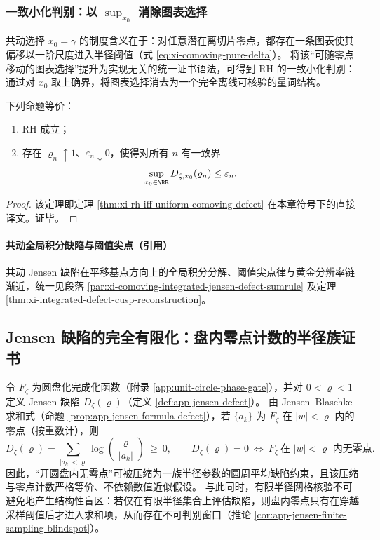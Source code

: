 \subsubsection{一致小化判别：以 \texorpdfstring{$\sup_{x_0}$}{sup\_{x0}} 消除图表选择}
共动选择 \(x_0=\gamma\) 的制度含义在于：对任意潜在离切片零点，都存在一条图表使其偏移以一阶尺度进入半径阈值（式 \eqref{eq:xi-comoving-pure-delta}）。
将该“可随零点移动的图表选择”提升为实现无关的统一证书语法，可得到 RH 的一致小化判别：通过对 \(x_0\) 取上确界，将图表选择消去为一个完全离线可核验的量词结构。
\begin{theorem}\label{thm:cdim-rh-iff-uniform-comoving-defect}
下列命题等价：
\begin{enumerate}
  \item[(i)] RH 成立；
  \item[(ii)] 存在 \(\varrho_n\uparrow 1\)、\(\varepsilon_n\downarrow 0\)，使得对所有 \(n\) 有一致界
  \[
  \sup_{x_0\in\RR}D_{\zeta,x_0}(\varrho_n)\le \varepsilon_n.
  \]
\end{enumerate}
\end{theorem}
\begin{proof}
该定理即定理 \ref{thm:xi-rh-iff-uniform-comoving-defect} 在本章符号下的直接译文。证毕。
\end{proof}

\paragraph{共动全局积分缺陷与阈值尖点（引用）}
共动 Jensen 缺陷在平移基点方向上的全局积分分解、阈值尖点律与黄金分辨率链渐近，统一见段落 \ref{par:xi-comoving-integrated-jensen-defect-sumrule} 及定理 \ref{thm:xi-integrated-defect-cusp-reconstruction}。




\subsection{Jensen 缺陷的完全有限化：盘内零点计数的半径族证书}\label{subsec:cdim-jensen-defect-finiteization}
令 \(F_\zeta\) 为圆盘化完成化函数（附录 \ref{app:unit-circle-phase-gate}），并对 \(0<\varrho<1\) 定义 Jensen 缺陷 \(D_\zeta(\varrho)\)（定义 \ref{def:app-jensen-defect}）。
由 Jensen--Blaschke 求和式（命题 \ref{prop:app-jensen-formula-defect}），若 \(\{a_k\}\) 为 \(F_\zeta\) 在 \(|w|<\varrho\) 内的零点（按重数计），则
\[
D_\zeta(\varrho)=\sum_{|a_k|<\varrho}\log\!\left(\frac{\varrho}{|a_k|}\right)\ \ge\ 0,
\qquad
D_\zeta(\varrho)=0\ \Longleftrightarrow\ F_\zeta\ \text{在 }|w|<\varrho\text{ 内无零点}.
\]
因此，“开圆盘内无零点”可被压缩为一族半径参数的圆周平均缺陷约束，且该压缩与零点计数严格等价、不依赖数值近似假设。
与此同时，有限半径网格核验不可避免地产生结构性盲区：若仅在有限半径集合上评估缺陷，则盘内零点只有在穿越采样阈值后才进入求和项，从而存在不可判别窗口（推论 \ref{cor:app-jensen-finite-sampling-blindspot}）。

